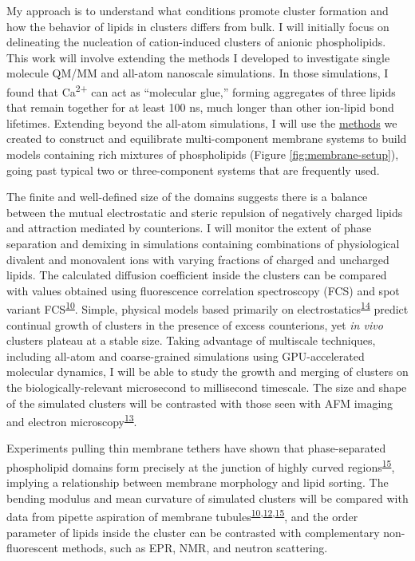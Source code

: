 \documentclass[11pt,notitlepage]{article}
\begin{document}
My approach is to understand what conditions promote cluster formation
and how the behavior of lipids in clusters differs from bulk. I will
initially focus on delineating the nucleation of cation-induced clusters
of anionic phospholipids. This work will involve extending the methods I
developed to investigate single molecule QM/MM and all-atom nanoscale
simulations. In those simulations, I found that Ca\textsuperscript{2+}
can act as ``molecular glue,'' forming aggregates of three lipids that
remain together for at least 100 ns, much longer than other ion-lipid
bond lifetimes. Extending beyond the all-atom simulations, I will use
the \href{https://github.com/biophyscode}{methods} we created to
construct and equilibrate multi-component membrane systems to build
models containing rich mixtures of phospholipids (Figure
\ref{fig:membrane-setup}), going past typical two or three-component
systems that are frequently used.

The finite and well-defined size of the domains suggests there is a
balance between the mutual electrostatic and steric repulsion of
negatively charged lipids and attraction mediated by counterions. I will
monitor the extent of phase separation and demixing in simulations
containing combinations of physiological divalent and monovalent ions
with varying fractions of charged and uncharged lipids. The calculated
diffusion coefficient inside the clusters can be compared with values
obtained using fluorescence correlation spectroscopy (FCS) and spot
variant FCS\textsuperscript{\protect\hyperlink{ref-oBaB5Z87}{10}}.
Simple, physical models based primarily on
electrostatics\textsuperscript{\protect\hyperlink{ref-10CqL9t0a}{14}}
predict continual growth of clusters in the presence of excess
counterions, yet \emph{in vivo} clusters plateau at a stable size.
Taking advantage of multiscale techniques, including all-atom and
coarse-grained simulations using GPU-accelerated molecular dynamics, I
will be able to study the growth and merging of clusters on the
biologically-relevant microsecond to millisecond timescale. The size and
shape of the simulated clusters will be contrasted with those seen with
AFM imaging and electron
microscopy\textsuperscript{\protect\hyperlink{ref-LhOwGz4k}{13}}.

Experiments pulling thin membrane tethers have shown that
phase-separated phospholipid domains form precisely at the junction of
highly curved
regions\textsuperscript{\protect\hyperlink{ref-XIltXoGI}{15}}, implying
a relationship between membrane morphology and lipid sorting. The
bending modulus and mean curvature of simulated clusters will be
compared with data from pipette aspiration of membrane
tubules\textsuperscript{\protect\hyperlink{ref-oBaB5Z87}{10},\protect\hyperlink{ref-aiu6Tmil}{12},\protect\hyperlink{ref-XIltXoGI}{15}},
and the order parameter of lipids inside the cluster can be contrasted
with complementary non-fluorescent methods, such as EPR, NMR, and
neutron scattering.
\end{document}
